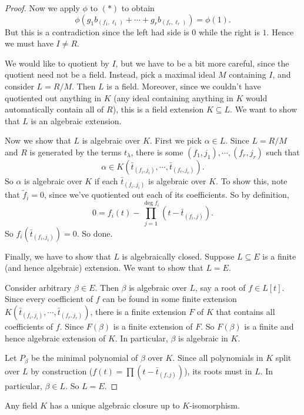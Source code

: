 \documentclass[a4paper]{article}
\begin{document}
\begin{proof}
  Now we apply $\phi$ to $(*)$ to obtain
  \[
    \phi(g_1 b_{(f_1, \ell_1)} + \cdots + g_r b_{(f_r, \ell_r)}) = \phi(1).
  \]
  But this is a contradiction since the left had side is $0$ while the right is $1$. Hence we must have $I \not= R$.

  We would like to quotient by $I$, but we have to be a bit more careful, since the quotient need not be a field. Instead, pick a maximal ideal $M$ containing $I$, and consider $L = R/M$. Then $L$ is a field. Moreover, since we couldn't have quotiented out anything in $K$ (any ideal containing anything in $K$ would automatically contain all of $R$), this is a field extension $K\subseteq L$. We want to show that $L$ is an algebraic extension.

  Now we show that $L$ is algebraic over $K$. First we pick $\alpha\in L$. Since $L = R/M$ and $R$ is generated by the terms $t_{\lambda}$, there is some $(f_1, j_1) ,\cdots, (f_r, j_r)$ such that
  \[
    \alpha \in K(\bar{t}_{(f_i, j_i)}, \cdots, \bar{t}_{(f_r, j_r)}).
  \]
  So $\alpha$ is algebraic over $K$ if each $\bar{t}_{(f_i, j_i)}$ is algebraic over $K$. To show this, note that $\tilde{f}_i = 0$, since we've quotiented out each of its coefficients. So by definition,
  \[
    0 = f_i(t) - \prod_{j = 1}^{\deg f_i} (t - \bar{t}_{(f_i, j)}).
  \]
  So $f_i(\bar{t}_{(f_i, j_i)}) = 0$. So done.

  Finally, we have to show that $L$ is algebraically closed. Suppose $L\subseteq E$ is a finite (and hence algebraic) extension. We want to show that $L = E$.

  Consider arbitrary $\beta \in E$. Then $\beta$ is algebraic over $L$, say a root of $f\in L[t]$. Since every coefficient of $f$ can be found in some finite extension $K(\bar{t}_{(f_i, j_i)}, \cdots, \bar{t}_{(f_r, j_r)})$, there is a finite extension $F$ of $K$ that contains all coefficients of $f$. Since $F(\beta)$ is a finite extension of $F$. So $F(\beta)$ is a finite and hence algebraic extension of $K$. In particular, $\beta$ is algebraic in $K$.

  Let $P_\beta$ be the minimal polynomial of $\beta$ over $K$. Since all polynomials in $K$ split over $L$ by construction ($f(t) = \prod (t - \bar{t}_{(f, j)})$), its roots must in $L$. In particular, $\beta \in L$. So $L = E$.
\end{proof}

\begin{thm}
  Any field $K$ has a unique algebraic closure up to $K$-isomorphism.
\end{thm}
\end{document}
